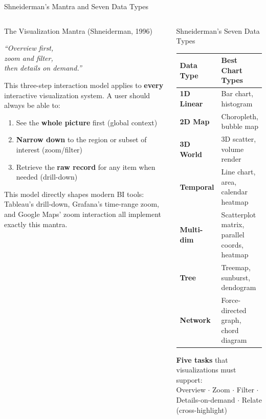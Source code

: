 \documentclass[aspectratio=169,10pt]{beamer}
\begin{document}
\begin{frame}{Shneiderman's Mantra and Seven Data Types}
  \begin{columns}[T]
      \begin{block}{The Visualization Mantra (Shneiderman, 1996)}
        \begin{center}
          \Large\textit{``Overview first,}\\
          \large\textit{zoom and filter,}\\
          \normalsize\textit{then details on demand.''}
        \end{center}
        \vspace{6pt}
        \small This three-step interaction model applies to \textbf{every} interactive visualization system.  A user should always be able to:
        \begin{enumerate}
          \item See the \textbf{whole picture} first (global context)
          \item \textbf{Narrow down} to the region or subset of interest (zoom/filter)
          \item Retrieve the \textbf{raw record} for any item when needed (drill-down)
        \end{enumerate}
        This model directly shapes modern BI tools: Tableau's drill-down, Grafana's time-range zoom, and Google Maps' zoom interaction all implement exactly this mantra.
      \end{block}

      \begin{exampleblock}{Shneiderman's Seven Data Types}
        {\small
        \renewcommand{\arraystretch}{1.35}
        \begin{tabular}{p{2.0cm}p{3.0cm}}
          \toprule
          \textbf{Data Type} & \textbf{Best Chart Types} \\
          \midrule
          \textbf{1D Linear}  & Bar chart, histogram \\
          \textbf{2D Map}     & Choropleth, bubble map \\
          \textbf{3D World}   & 3D scatter, volume render \\
          \textbf{Temporal}   & Line chart, area, calendar heatmap \\
          \textbf{Multi-dim}  & Scatterplot matrix, parallel coords, heatmap \\
          \textbf{Tree}       & Treemap, sunburst, dendogram \\
          \textbf{Network}    & Force-directed graph, chord diagram \\
          \bottomrule
        \end{tabular}
        }
        \vspace{4pt}
        \textbf{Five tasks} that visualizations must support:\\
        \small Overview $\cdot$ Zoom $\cdot$ Filter $\cdot$ Details-on-demand $\cdot$ Relate (cross-highlight)
      \end{exampleblock}
  \end{columns}
\end{frame}
\end{document}
